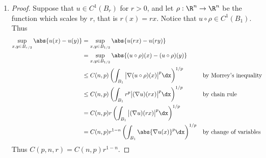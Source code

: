 \documentclass[12pt,letterpaper]{article}
\begin{document}
\begin{enumerate}
\begin{enumerate}[label=(\alph*)]
	\item \mbox{}\vspace*{-22pt}
	\begin{proof}
	Suppose that $u\in C^1(B_r)$ for $r>0$, and let $\rho:\R^n\to\R^n$ be the function which scales by $r$, that is $r(x)=rx$. Notice that $u\circ \rho \in C^1(B_1)$. Thus 
	\begin{align*}
	\sup_{x,y\in B_{r/2}}\abs{u(x)-u(y)}
	&=\sup_{x,y\in B_{1/2}}\abs{u(rx)-u(ry)} \\
	&=\sup_{x,y\in B_{1/2}}\abs{(u\circ\rho)(x)-(u\circ \rho)(y)} \\
	&\leq C(n,p)\left(\int_{B_1}\big|\nabla (u\circ\rho)(x)\big|^p \dx \right)^{1/p} &&\text{by Morrey's inequality} \\
	&\leq C(n,p)\left(\int_{B_1}r^p\big|(\nabla u)(rx)\big|^p \dx \right)^{1/p} &&\text{by chain rule} \\
	&= C(n,p)r\left(\int_{B_1}\big|(\nabla u)(rx)\big|^p \dx \right)^{1/p}\\
	&= C(n,p)r^{1-n}\left(\int_{B_1}\abs{\nabla u(x)}^p \dx \right)^{1/p} && \text{by change of variables} 
	\end{align*}
	Thus $C(p,n,r)=C(n,p)r^{1-n}$. 
	\end{proof}
	\end{enumerate}

\end{enumerate}
\end{document}
